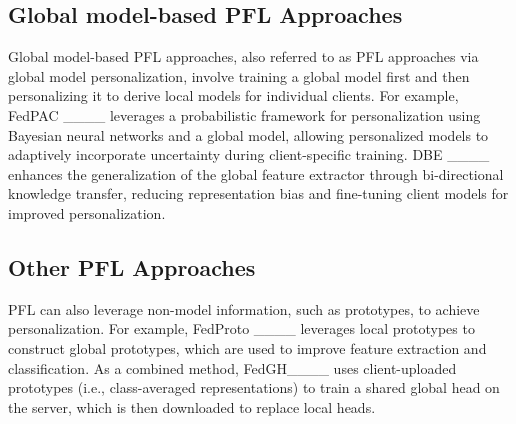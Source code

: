 \subsection{ Global model-based PFL Approaches}
Global model-based PFL approaches, also referred to as PFL approaches via global model personalization, involve training a global model first and then personalizing it to derive local models for individual clients. For example, 
FedPAC ____ leverages a probabilistic framework for personalization using Bayesian neural networks and a global model, allowing personalized models to adaptively incorporate uncertainty during client-specific training. DBE ____ enhances the generalization of the global feature extractor through bi-directional knowledge transfer, reducing representation bias and fine-tuning client models for improved personalization.



\subsection{Other PFL Approaches}
PFL can also leverage non-model information, such as prototypes, to achieve personalization. For example, FedProto ____ leverages local prototypes to construct global prototypes, which are used to improve feature extraction and classification. As a combined method, FedGH____ uses client-uploaded prototypes (i.e., class-averaged representations) to train a shared global head on the server, which is then downloaded to replace local heads.

